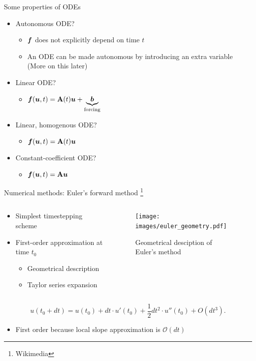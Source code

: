 \documentclass[presentation]{beamer}
\newcommand{\gv}[1]{\ensuremath{\mbox{\boldmath$ #1 $}}}
\newcommand{\bv}[1]{\ensuremath{\mathbf{#1}}}
\newcommand{\order}[1]{\mathcal O \left( #1 \right)} %
\begin{document}
\begin{frame}[label={sec:org99e5e10}]{Some properties of ODEs}
\begin{itemize}
\item \alert{Autonomous} ODE?
\begin{itemize}
\item \(\gv{f}\) does not explicitly depend on time \(t\)
\item An ODE can be made autonomous by introducing an extra variable (More on
this later)
\end{itemize}
\item \alert{Linear} ODE?
\begin{itemize}
\item \(\gv{f}(\gv{u}, t) =  \bv{A}(t)\gv{u} + \underbrace{\gv{b}}_{\text{forcing}}\)
\end{itemize}
\item \alert{Linear, homogenous} ODE?
\begin{itemize}
\item \(\gv{f}(\gv{u}, t) =  \bv{A}(t)\gv{u}\)
\end{itemize}
\item \alert{Constant-coefficient} ODE?
\begin{itemize}
\item \(\gv{f}(\gv{u}, t) =  \bv{A}\gv{u}\)
\end{itemize}
\end{itemize}
\end{frame}
\begin{frame}[label={sec:org4f317a1}]{Numerical methods: Euler's forward method \footnote{Wikimedia}}
\begin{columns}
\begin{column}{0.5\columnwidth}
\begin{itemize}
\item Simplest timestepping scheme
\item First-order approximation at time \(t_0\)
\begin{itemize}
\item Geometrical description
\item Taylor series expansion
\end{itemize}
\end{itemize}
\end{column}
\begin{column}{0.4\columnwidth}
\begin{figure}[htbp]
\centering
\texttt{[image: images/euler\_geometry.pdf]}
\caption{Geometrical desciption of Euler's method}
\end{figure}
\end{column}
\end{columns}

\[ u(t_{0}+dt)=u(t_{0})+dt \cdot u'(t_{0})+{\frac {1}{2}}dt^{2} \cdot u''(t_{0})+O(dt^{3}). \]
\begin{itemize}
\item First order because local slope approximation is \(\order{dt}\)
\end{itemize}
\end{frame}
\end{document}
